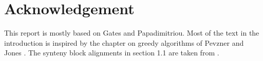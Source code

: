 \section{Acknowledgement}
This report is mostly based on Gates and Papadimitriou\cite{bounds}. Most of the text in the introduction is inspired by the chapter on greedy algorithms of Pevzner  and Jones \cite{introduction_to_bioinformatic_algorithms}. The synteny block alignments in section 1.1 are taken from \cite{rat_genome}.